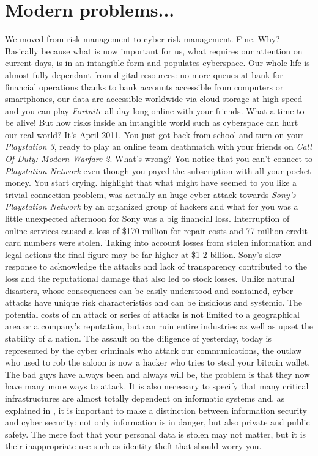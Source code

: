 \section{Modern problems...}
We moved from risk management to cyber risk management. Fine. Why?\newline
Basically because what is now important for us, what requires our attention on current days, is in an intangible form and populates cyberspace. Our whole life is almost fully dependant from digital resources: no more queues at bank for financial operations thanks to bank accounts accessible from computers or smartphones, our data are accessible worldwide via cloud storage at high speed and you can play \textit{Fortnite} all day long online with your friends. What a time to be alive! But how risks inside an intangible world such as cyberspace can hurt our real world?\newline
It's April 2011. You just got back from school and turn on your \textit{Playstation 3}, ready to play an online team deathmatch with your friends on \textit{Call Of Duty: Modern Warfare 2}. What's wrong? You notice that you can't connect to \textit{Playstation Network} even though you payed the subscription with all your pocket money. You start crying.\newline
\cite{Sheppard2013} highlight that what might have seemed to you like a trivial connection problem, was actually an huge cyber attack towards \textit{Sony's Playstation Network} by an organized group of hackers and what for you was a little unexpected afternoon for Sony was a big financial loss. Interruption of online services caused a loss of \$170 million for repair costs and 77 million credit card numbers were stolen. Taking into account losses from stolen information and legal actions the final figure may be far higher at \$1-2 billion. Sony's slow response to acknowledge the attacks and lack of transparency contributed to the loss and the reputational damage that also led to stock losses. Unlike natural disasters, whose consequences can be easily understood and contained, cyber attacks have unique risk characteristics and can be insidious and systemic. The potential costs of an attack or series of attacks is not limited to a geographical area or a company’s reputation, but can ruin entire industries as well as upset the stability of a nation.\newline
The assault on the diligence of yesterday, today is represented by the cyber criminals who attack our communications, the outlaw who used to rob the saloon is now a hacker who tries to steal your bitcoin wallet. The bad guys have always been and always will be, the problem is that they now have many more ways to attack. It is also necessary to specify that many critical infrastructures are almost totally dependent on informatic systems and, as explained in \cite{Solms2013}, it is important to make a distinction between information security and cyber security: not only information is in danger, but also private and public safety. The mere fact that your personal data is stolen may not matter, but it is their inappropriate use such as identity theft that should worry you.
